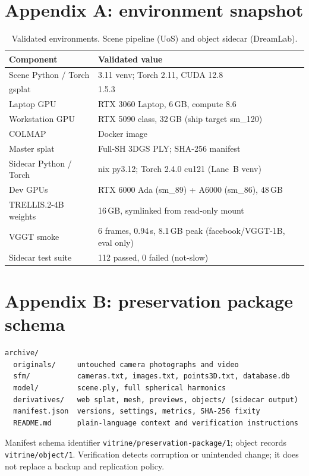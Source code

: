 \onecolumn
\section*{Appendix A: environment snapshot}
\small

\begin{table}[h]
\centering
\caption{Validated environments. Scene pipeline (UoS) and object sidecar (DreamLab).
}
\begin{tabular}{@{}ll@{}}
\toprule
Component & Validated value \\
\midrule
Scene Python / Torch & 3.11 venv; Torch 2.11, CUDA 12.8 \\
gsplat & 1.5.3 \\
Laptop GPU & RTX 3060 Laptop, 6\,GB, compute 8.6 \\
Workstation GPU & RTX 5090 class, 32\,GB (ship target sm\_120) \\
COLMAP & Docker image \\
Master splat & Full-SH 3DGS PLY; SHA-256 manifest \\
\midrule
Sidecar Python / Torch & nix py3.12; Torch 2.4.0 cu121 (Lane~B venv) \\
Dev GPUs & RTX 6000 Ada (sm\_89) + A6000 (sm\_86), 48\,GB \\
TRELLIS.2-4B weights & 16\,GB, symlinked from read-only mount \\
VGGT smoke & 6 frames, 0.94\,s, 8.1\,GB peak (facebook/VGGT-1B, eval only) \\
Sidecar test suite & 112 passed, 0 failed (not-slow) \\
\bottomrule
\end{tabular}
\end{table}

\section*{Appendix B: preservation package schema}
\begin{verbatim}
archive/
  originals/     untouched camera photographs and video
  sfm/           cameras.txt, images.txt, points3D.txt, database.db
  model/         scene.ply, full spherical harmonics
  derivatives/   web splat, mesh, previews, objects/ (sidecar output)
  manifest.json  versions, settings, metrics, SHA-256 fixity
  README.md      plain-language context and verification instructions
\end{verbatim}
Manifest schema identifier \texttt{vitrine/preservation-package/1}; object records
\texttt{vitrine/object/1}. Verification detects corruption or unintended change; it does not
replace a backup and replication policy.

